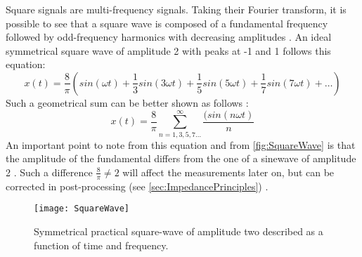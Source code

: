 Square signals are multi-frequency signals. Taking their Fourier transform, it is possible to see that a square wave is composed of a fundamental frequency followed by odd-frequency harmonics with decreasing amplitudes \cite{Subhan2019}. An ideal symmetrical square wave of amplitude 2 with peaks at -1 and 1 \cite{ramaley1969theory} follows this equation:
\begin{equation}
   x(t) = \frac{8}{\pi} (sin(\omega t) + \frac{1}{3} sin(3 \omega t) + \frac{1}{5} sin(5 \omega t) + \frac{1}{7} sin(7 \omega t) + \dots)
\end{equation}
Such a geometrical sum can be better shown as follows \cite{Subhan2019,ramaley1969theory}:
\begin{equation}
\label{eq:Squarewave}
   x(t) = \frac{8}{\pi} \displaystyle\sum_{n=1,3,5,7...} ^{\infty} \frac{(sin(n \omega t)}{n} 
\end{equation}
An important point to note from this equation and from \autoref{fig:SquareWave} is that the amplitude of the fundamental differs from the one of a sinewave of amplitude 2 \cite{ramaley1969theory}. Such a difference $\frac{8}{\pi} \neq 2$ will affect the measurements later on, but can be corrected in post-processing (see \autoref{sec:ImpedancePrinciples}) \cite{Subhan2019}. 
\begin{figure}[h]
    \texttt{[image: SquareWave]}
    \caption{Symmetrical practical square-wave of amplitude two described as a function of time and frequency.}
    \label{fig:SquareWave}
\end{figure}